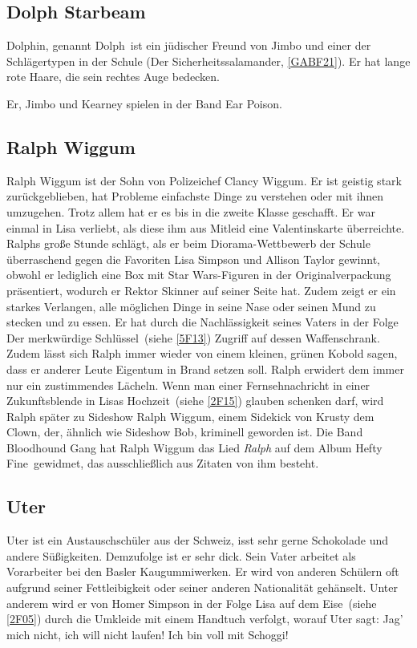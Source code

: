 \subsection{Dolph Starbeam}\label{DolphStarbeam}
Dolphin, genannt \glqq Dolph\grqq\ ist ein jüdischer Freund von Jimbo und einer der Schlägertypen in der Schule (\glqq Der Sicherheitssalamander\grqq , \ref{GABF21}). Er hat lange rote Haare, die sein rechtes Auge bedecken.

Er, Jimbo und Kearney spielen in der Band \glqq Ear Poison\grqq .

\subsection{Ralph Wiggum}
Ralph Wiggum ist der Sohn von Polizeichef Clancy Wiggum. Er ist geistig stark zurückgeblieben, hat Probleme einfachste Dinge zu verstehen oder mit ihnen umzugehen. Trotz allem hat er es bis in die zweite Klasse geschafft. Er war einmal in Lisa verliebt, als diese ihm aus Mitleid eine Valentinskarte überreichte. Ralphs große Stunde schlägt, als er beim Diorama-Wettbewerb der Schule überraschend gegen die Favoriten Lisa Simpson und Allison Taylor gewinnt, obwohl er lediglich eine Box mit Star Wars-Figuren in der Originalverpackung präsentiert, wodurch er Rektor Skinner auf seiner Seite hat. Zudem zeigt er ein starkes Verlangen, alle möglichen Dinge in seine Nase oder seinen Mund zu stecken und zu essen. Er hat durch die Nachlässigkeit seines Vaters in der Folge \glqq Der merkwürdige Schlüssel\grqq\ (siehe \ref{5F13}) Zugriff auf dessen Waffenschrank. Zudem lässt sich Ralph immer wieder von einem kleinen, grünen Kobold sagen, dass er anderer Leute Eigentum in Brand setzen soll. Ralph erwidert dem immer nur ein zustimmendes Lächeln. Wenn man einer Fernsehnachricht in einer Zukunftsblende in \glqq Lisas Hochzeit\grqq\ (siehe \ref{2F15}) glauben schenken darf, wird Ralph später zu Sideshow Ralph Wiggum, einem Sidekick von Krusty dem Clown, der, ähnlich wie Sideshow Bob, kriminell geworden ist. Die Band Bloodhound Gang hat Ralph Wiggum das Lied \emph{Ralph} auf dem Album \glqq Hefty Fine\grqq\ gewidmet, das ausschließlich aus Zitaten von ihm besteht.

\subsection{Uter}
Uter ist ein Austauschschüler aus der Schweiz, isst sehr gerne Schokolade und andere Süßigkeiten. Demzufolge ist er sehr dick. Sein Vater arbeitet als Vorarbeiter bei den Basler Kaugummiwerken. Er wird von anderen Schülern oft aufgrund seiner Fettleibigkeit oder seiner anderen Nationalität gehänselt. Unter anderem wird er von Homer Simpson in der Folge \glqq Lisa auf dem Eise\grqq\ (siehe \ref{2F05}) durch die Umkleide mit einem Handtuch verfolgt, worauf Uter sagt: \glqq Jag' mich nicht, ich will nicht laufen! Ich bin voll mit Schoggi!\grqq

